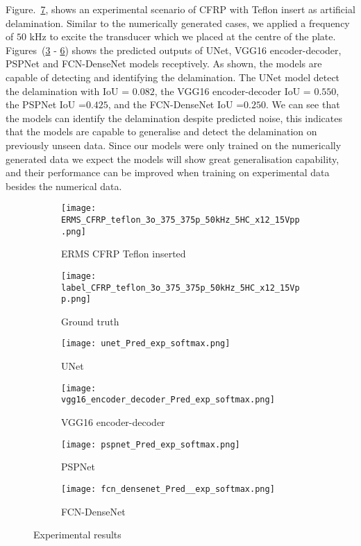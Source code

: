 Figure.~\ref{fig:Exp_ERMS_teflon}, shows an experimental scenario of CFRP with Teflon insert as artificial delamination.
Similar to the numerically generated cases, we applied a frequency of \(50\) kHz to excite the transducer which we placed at the centre of the plate.
Figures~(\ref{fig:unet_exp_7_} - \ref{fig:fcn_densenet_exp}) shows the predicted outputs of UNet, VGG16 encoder-decoder, PSPNet and FCN-DenseNet models receptively.
As shown, the models are capable of detecting and identifying the delamination. 
The UNet model detect the delamination with IoU = \(0.082\), the VGG16 encoder-decoder IoU  = \(0.550\), the PSPNet IoU =\(0.425\), and the FCN-DenseNet IoU =\(0.250\).
We can see that the models can identify the delamination despite predicted noise, this indicates that the models are capable to generalise and detect the delamination on previously unseen data. 
Since our models were only trained on the numerically generated data we expect the models will show great generalisation capability, and their performance can be improved when training on experimental data besides the numerical data. 
\begin{figure} [!h]
	\centering
	\begin{subfigure}[b]{0.47\textwidth}
		\centering
		\texttt{[image: ERMS\_CFRP\_teflon\_3o\_375\_375p\_50kHz\_5HC\_x12\_15Vpp.png]}
		\caption{ERMS CFRP Teflon inserted}
		\label{fig:Delamination}
	\end{subfigure}			
	\hfill
	\begin{subfigure}[b]{0.47\textwidth}
		\centering 	
		\texttt{[image: label\_CFRP\_teflon\_3o\_375\_375p\_50kHz\_5HC\_x12\_15Vpp.png]}
		\caption{Ground truth} 
		\label{fig:damage_label}
	\end{subfigure}
	\hfill
	\begin{subfigure}[b]{0.47\textwidth}
		\centering
		\texttt{[image: unet\_Pred\_exp\_softmax.png]}
		\caption{UNet} 
		\label{fig:unet_exp_7_}
	\end{subfigure}
	\hfill
	\begin{subfigure}[b]{0.47\textwidth}
	\centering
	\texttt{[image: vgg16\_encoder\_decoder\_Pred\_exp\_softmax.png]}
	\caption{VGG16 encoder-decoder} 
	\label{fig:vgg16_exp_7_}
	\end{subfigure}
	\hfill
	\begin{subfigure}[b]{0.47\textwidth}
		\centering
		\texttt{[image: pspnet\_Pred\_exp\_softmax.png]}
		\caption{PSPNet} 
		\label{fig:pspnet_exp_7_}
	\end{subfigure}
	\hfill
	\begin{subfigure}[b]{0.47\textwidth}
		\centering
		\texttt{[image: fcn\_densenet\_Pred\_\_exp\_softmax.png]}
		\caption{FCN-DenseNet} 
		\label{fig:fcn_densenet_exp}
	\end{subfigure}
		\caption{Experimental results}
		\label{fig:Exp_ERMS_teflon}
	\end{figure}

